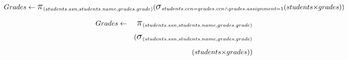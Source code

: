 \documentclass[]{article}
\newcommand{\select}{\mbox{\Large$\sigma$}}
\newcommand{\cross}{\mbox{$\times$}}
\newcommand{\project}{\mbox{\Large$\pi$}}
\begin{document}
\begin{displaymath}
Grades \leftarrow \project_{(students.ssn, students.name, grades.grade)} \\
(\select_{students.ccn = grades.ccn \wedge grades.assignment = 1} \\
(students \cross grades)) \\
\end{displaymath}

\begin{eqnarray*}
Grades & \leftarrow & \project_{(students.ssn, students.name, grades.grade)}  \\
       &            &(\select_{(students.ssn, students.name, grades.grade)}  \\
       &            &          (students \cross grades)) 
\end{eqnarray*}
\end{document}
